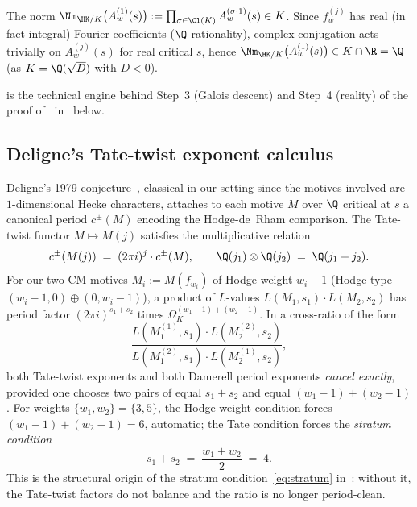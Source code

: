 \begin{corollary}
\label{cor:K-rational-norm}
The norm
$\Nm_{\HK/K}\bigl(A_w^{(1)}(s)\bigr) := \prod_{\sigma \in \Cl(K)}
A_w^{(\sigma \cdot 1)}(s)
\in K$. Since $f_w^{(j)}$ has real (in fact integral)
Fourier coefficients ($\Q$-rationality), complex conjugation acts
trivially on $A_w^{(j)}(s)$ for real critical $s$, hence
$\Nm_{\HK/K}\bigl(A_w^{(1)}(s)\bigr) \in K \cap \R = \Q$ (as $K
= \Q(\sqrt{D})$ with $D < 0$).
\end{corollary}

 is the technical engine behind
Step~3 (Galois descent) and Step~4 (reality) of the proof
of~ in~ below.

\subsection{Deligne's Tate-twist exponent calculus}
\label{ss:deligne-tate}

Deligne's 1979 conjecture~\cite{Deligne1979}, classical in our
setting since the motives involved are $1$-dimensional Hecke
characters, attaches to each motive $M$ over $\Q$ critical at $s$
a canonical period $c^\pm(M)$ encoding the Hodge-de~Rham
comparison. The Tate-twist functor $M \mapsto M(j)$ satisfies the
multiplicative relation
\begin{equation}\label{eq:tate-twist}
c^\pm(M(j)) \;=\; (2\pi i)^j \cdot c^\pm(M),
\qquad \Q(j_1) \otimes \Q(j_2) \;=\; \Q(j_1 + j_2).
\end{equation}
For our two CM motives $M_i := M(f_{w_i})$ of Hodge weight
$w_i - 1$ (Hodge type $(w_i - 1, 0) \oplus (0, w_i - 1)$), a
product of $L$-values $L(M_1, s_1) \cdot L(M_2, s_2)$ has period
factor $(2\pi i)^{s_1 + s_2}$ times $\Omega_K^{(w_1 - 1) + (w_2 - 1)}$.
In a cross-ratio of the form
\begin{equation}\label{eq:cross-ratio-form}
\frac{L(M_1^{(1)}, s_1) \cdot L(M_2^{(2)}, s_2)}
     {L(M_1^{(2)}, s_1) \cdot L(M_2^{(1)}, s_2)},
\end{equation}
both Tate-twist exponents and both Damerell period exponents
\emph{cancel exactly}, provided one chooses two pairs of equal
$s_1 + s_2$ and equal $(w_1 - 1) + (w_2 - 1)$. For weights
$\{w_1, w_2\} = \{3, 5\}$, the Hodge weight condition forces
$(w_1 - 1) + (w_2 - 1) = 6$, automatic; the Tate condition forces
the \emph{stratum condition}
\begin{equation}\label{eq:stratum-2}
s_1 + s_2 \;=\; \frac{w_1 + w_2}{2} \;=\; 4.
\end{equation}
This is the structural origin of the stratum
condition~\eqref{eq:stratum} in~: without it, the
Tate-twist factors do not balance and the ratio is no longer
period-clean.

